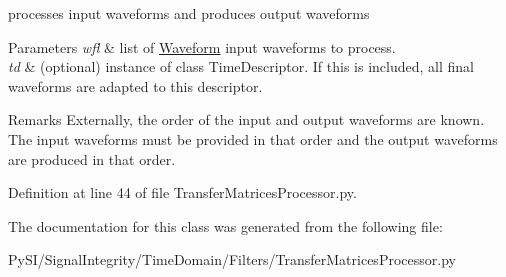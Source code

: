 processes input waveforms and produces output waveforms 


\begin{DoxyParams}{Parameters}
{\em wfl} & list of \hyperlink{namespaceSignalIntegrity_1_1TimeDomain_1_1Waveform}{Waveform} input waveforms to process. \\
\hline
{\em td} & (optional) instance of class Time\+Descriptor. If this is included, all final waveforms are adapted to this descriptor. \\
\hline
\end{DoxyParams}
\begin{DoxyRemark}{Remarks}
Externally, the order of the input and output waveforms are known. The input waveforms must be provided in that order and the output waveforms are produced in that order. 
\end{DoxyRemark}


Definition at line 44 of file Transfer\+Matrices\+Processor.\+py.



The documentation for this class was generated from the following file\+:\begin{DoxyCompactItemize}
\item 
Py\+S\+I/\+Signal\+Integrity/\+Time\+Domain/\+Filters/Transfer\+Matrices\+Processor.\+py\end{DoxyCompactItemize}
